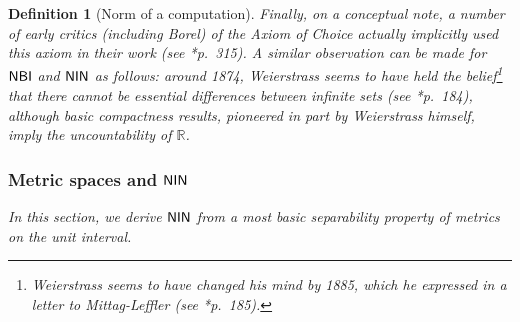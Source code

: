 \documentclass[reqno]{amsart}
\newtheorem{defi}[thm]{Definition}
\def\R{{\mathbb  R}}
\def\NBI{\textup{\textsf{NBI}}}
\def\NIN{\textup{\textsf{NIN}}}
\numberwithin{equation}{section}
\numberwithin{thm}{section}
\begin{document}
\begin{defi}[Norm of a computation]
\smallskip

Finally, on a conceptual note, a number of early critics (including Borel) of the \emph{Axiom of Choice} actually implicitly used this axiom in their work (see \cite{nofega}*{p.~315}).  A similar observation can be made for $\NBI$ and $\NIN$ as follows:  around 1874, Weierstrass seems to have held the belief\footnote{Weierstrass seems to have changed his mind by 1885, which he expressed in a letter to Mittag-Leffler (see \cite{nofega}*{p.\ 185}).} that there cannot be essential differences between infinite sets (see \cite{nofega}*{p.\ 184}), 
although basic compactness results, pioneered in part by Weierstrass himself, imply the uncountability of $\R$.  

\subsubsection{Metric spaces and $\NIN$}\label{metri}
In this section, we derive $\NIN$ from a most basic separability property of metrics on the unit interval. 

\smallskip


\end{defi}
\end{document}
